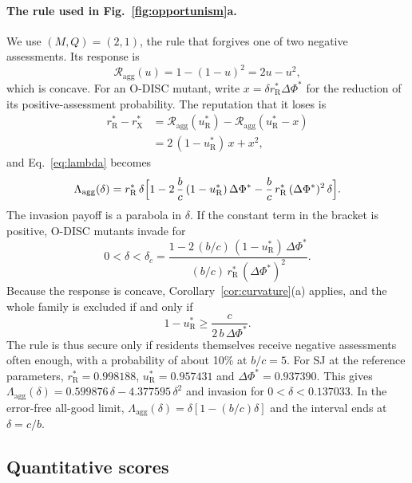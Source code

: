 \documentclass[10pt]{wlscirep}
\newcommand{\Rmap}{\mathscr{R}}            %
\newcommand{\rR}{r_{\mathrm{R}}^{*}}
\newcommand{\uR}{u_{\mathrm{R}}^{*}}
\newcommand{\rX}{r_{\mathrm{X}}^{*}}
\newcommand{\dPhi}{\Delta\Phi^{*}}
\theoremstyle{plain}
\theoremstyle{remark}
\begin{document}
\paragraph{The rule used in Fig.~\ref{fig:opportunism}a.} We use $(M,Q)=(2,1)$, the rule that forgives one of two negative assessments. Its response is
\begin{equation}
\Rmap_{\mathrm{agg}}(u)=1-(1-u)^2=2u-u^2,
\label{eq:s-agg-21}
\end{equation}
which is concave. For an O-DISC mutant, write $x=\delta\rR\dPhi$ for the reduction of its positive-assessment probability. The reputation that it loses is
\begin{equation}
\begin{aligned}
\rR-\rX&=\Rmap_{\mathrm{agg}}(\uR)-\Rmap_{\mathrm{agg}}(\uR-x)\\
&=2\,(1-\uR)\,x+x^2,
\end{aligned}
\label{eq:s-agg-loss}
\end{equation}
and Eq.~\eqref{eq:lambda} becomes
\begin{equation}
\Lambda_{\mathrm{agg}}(\delta)=\rR\,\delta\Bigl[1-2\,\frac{b}{c}\,(1-\uR)\,\dPhi-\frac{b}{c}\,\rR\,(\dPhi)^2\,\delta\Bigr].
\label{eq:s-aggregation-lambda}
\end{equation}
The invasion payoff is a parabola in $\delta$. If the constant term in the bracket is positive, O-DISC mutants invade for
\begin{equation}
0<\delta<\delta_c=\frac{1-2\,(b/c)\,(1-\uR)\,\dPhi}{(b/c)\,\rR\,(\dPhi)^2}.
\label{eq:s-agg-window}
\end{equation}
Because the response is concave, Corollary~\ref{cor:curvature}(a) applies, and the whole family is excluded if and only if
\begin{equation}
1-\uR\geq\frac{c}{2\,b\,\dPhi}.
\label{eq:s-agg-secure}
\end{equation}
The rule is thus secure only if residents themselves receive negative assessments often enough, with a probability of about 10\% at $b/c=5$. For SJ at the reference parameters, $\rR=0.998188$, $\uR=0.957431$ and $\dPhi=0.937390$. This gives $\Lambda_{\mathrm{agg}}(\delta)=0.599876\,\delta-4.377595\,\delta^2$ and invasion for $0<\delta<0.137033$. In the error-free all-good limit, $\Lambda_{\mathrm{agg}}(\delta)=\delta[1-(b/c)\delta]$ and the interval ends at $\delta=c/b$.

\subsection{Quantitative scores}
\end{document}
